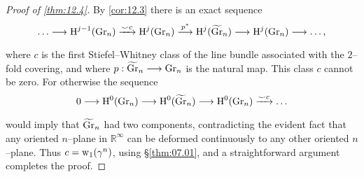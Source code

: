 \documentclass[../main]{subfiles}
\begin{document}
\begin{proof}[Proof of \ref{thm:12.4}]
By \ref{cor:12.3} there is an exact sequence \[\ldots \varrightarrow{} \homology^{j - 1}(\grassmannian_n) \varrightarrow{\smile c} \homology^j(\grassmannian_n) \varrightarrow{p^\ast} \homology^j({\xtilde \grassmannian}_n) \longrightarrow \homology^j(\grassmannian_n) \longrightarrow \ldots,\] where $c$ is the first Stiefel--Whitney class of the line bundle associated with the $2$--fold covering, and where $p : {\xtilde \grassmannian}_n \longrightarrow \grassmannian_n$ is the natural map. This class $c$ cannot be zero. For otherwise the sequence \[0 \varrightarrow{} \homology^0(\grassmannian_n) \varrightarrow{} \homology^0({\xtilde \grassmannian}_n) \varrightarrow{} \homology^0(\grassmannian_n) \varrightarrow{\smile c} \ldots\] would imply that ${\xtilde \grassmannian}_n$ had two components, contradicting the evident fact that any oriented $n$--plane in ${\mathbb R}^\infty$ can be deformed continuously to any other oriented $n$--plane. Thus $c = \operatorname{w}_1(\gamma^n)$, using \S\ref{thm:07.01}, and a straightforward argument completes the proof. 
\end{proof}
\end{document}
